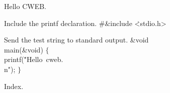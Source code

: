 

Hello CWEB.

\fi

Include the printf declaration.
\Y\B\8\#\&{include} \.{<stdio.h>}\par
\fi

Send the test string to standard output.
\Y\B\1\1\&{void} \\{main}(\&{void})\2\2\6
${}\{{}$\1\6
\\{printf}(\.{"Hello\ cweb.\\n"});\6
\4${}\}{}$\2\par
\fi

Index.

\fi


\inx
\fin
\con

